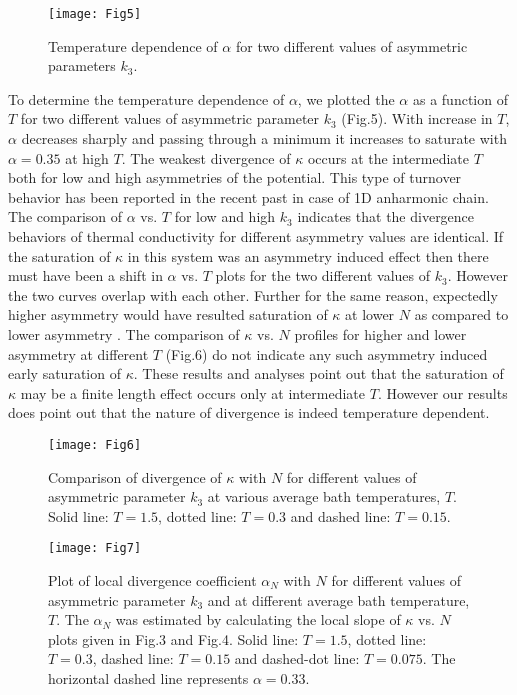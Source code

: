 \documentclass[aps,pre,reprint,groupedaddress]{revtex4-1}
\begin{document}
\begin{figure}
	\centering
	\texttt{[image: Fig5]}
	\caption{Temperature dependence of $\alpha$ for two different values of asymmetric parameters $k_3$.}
	\label{fig:fig5}
\end{figure}

To determine the temperature dependence of $\alpha$, we plotted the $\alpha$ as a function of $T$ for two different values of asymmetric parameter $k_3$ (Fig.5). With increase in $T$, $\alpha$ decreases sharply and passing through a minimum it increases to saturate with $\alpha=0.35$ at high $T$. The weakest divergence of $\kappa$ occurs at the intermediate $T$ both for low and high asymmetries of the potential. This type of turnover behavior has been reported in the recent past \cite{Xiong2014,Xiong2016} in case of 1D anharmonic chain. The comparison of $\alpha$ vs. $T$ for low and high $k_3$ indicates that the divergence behaviors of thermal conductivity for different asymmetry values are identical. If the saturation of $\kappa$ in this system was an asymmetry induced effect then there must have been a shift in $\alpha$ vs. $T$ plots for the two different values of $k_3$. However the two curves overlap with each other. Further for the same reason, expectedly higher asymmetry would have resulted saturation of $\kappa$ at lower $N$ as compared to lower asymmetry \cite{Das2014}. The comparison of $\kappa$ vs. $N$ profiles for higher and lower asymmetry at different $T$ (Fig.6) do not indicate any such asymmetry induced early saturation of $\kappa$. These results and analyses point out that the saturation of $\kappa$ may be a finite length effect occurs only at intermediate $T$. However our results does point out that the nature of divergence is indeed temperature dependent.

\begin{figure}
	\centering
	\texttt{[image: Fig6]}
	\caption{Comparison of divergence of $\kappa$ with $N$ for different values of asymmetric parameter $k_3$ at various average bath temperatures, $T$. Solid line: $T=1.5$, dotted line: $T=0.3$ and dashed line: $T=0.15$.}
	\label{fig:fig6}
\end{figure}

\begin{figure}
	\centering
	\texttt{[image: Fig7]}
	\caption{Plot of local divergence coefficient $\alpha_N$ with $N$ for different values of asymmetric parameter $k_3$ and at different average bath temperature, $T$. The $\alpha_N$ was estimated by calculating the local slope of $\kappa$ vs. $N$ plots given in Fig.3 and Fig.4. Solid line: $T=1.5$, dotted line: $T=0.3$, dashed line: $T=0.15$ and dashed-dot line: $T=0.075$. The horizontal dashed line represents $\alpha=0.33$.}
	\label{fig:fig7}
\end{figure}
\end{document}

